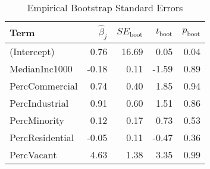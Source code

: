 \begin{table}[ht]
\centering
\begin{tabular}{lrrrr}
  \hline
Term & $\widehat{\beta}_{j}$ & $SE_{\text{boot}}$ & $t_{\text{boot}}$ & $p_{\text{boot}}$ \\ 
  \hline
(Intercept) & 0.76 & 16.69 & 0.05 & 0.04 \\ 
  MedianInc1000 & -0.18 & 0.11 & -1.59 & 0.89 \\ 
  PercCommercial & 0.74 & 0.40 & 1.85 & 0.94 \\ 
  PercIndustrial & 0.91 & 0.60 & 1.51 & 0.86 \\ 
  PercMinority & 0.12 & 0.17 & 0.73 & 0.53 \\ 
  PercResidential & -0.05 & 0.11 & -0.47 & 0.36 \\ 
  PercVacant & 4.63 & 1.38 & 3.35 & 0.99 \\ 
   \hline
\end{tabular}
\caption{Empirical Bootstrap Standard Errors} 
\end{table}
